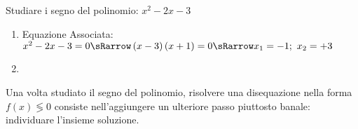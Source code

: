 \begin{esempio}
Studiare i segno del polinomio: \(x^2-2x-3\)

\begin{enumerate}
 \item
  Equazione Associata:~~\(x^2-2x-3=0 \sRarrow 
                         \left(x-3 \right)\left(x+1\right)=0 \sRarrow 
                         x_1=-1;~x_2=+3\)
 \item 
                    {}
\end{enumerate}

\end{esempio}

Una volta studiato il segno del polinomio, risolvere una disequazione nella 
forma \(f(x) \lessgtr 0\) consiste nell'aggiungere un ulteriore passo 
piuttosto banale: individuare l'insieme soluzione.

\newpage %


